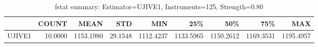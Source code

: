 \begin{table}[ht]
\centering
\caption{fstat summary: Estimator=UJIVE1, Instruments=125, Strength=0.80}
\begin{tabular}{lrrrrrrrr}
\toprule
 & COUNT & MEAN & STD & MIN & 25\% & 50\% & 75\% & MAX \\
\midrule
UJIVE1 & 10.0000 & 1153.1980 & 29.1548 & 1112.4237 & 1133.5965 & 1150.2612 & 1169.3531 & 1195.4957 \\
\bottomrule
\end{tabular}
\end{table}
